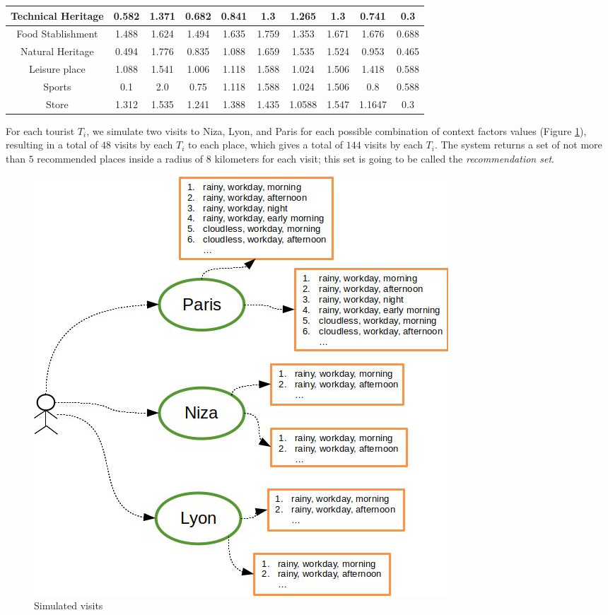 \begin{table}[h!]
\begin{tabular}{ |c|c|c|c|c|c|c|c|c|c| }
    Technical Heritage &
    0.582  & 1.371 & 0.682  & 0.841  & 1.3 & 1.265 & 1.3 & 0.741  & 0.3 \\ \hline
    
    Food Stablishment &
    1.488  & 1.624 & 1.494  & 1.635  & 1.759 & 1.353 & 1.671 & 1.676  & 0.688  \\ \hline
    
    Natural Heritage &
    0.494  & 1.776 & 0.835  & 1.088  & 1.659 & 1.535  & 1.524 & 0.953 & 0.465 \\ \hline
    
    Leisure place &
    1.088  & 1.541  & 1.006 & 1.118 & 1.588  & 1.024 & 1.506 & 1.418 & 0.588  \\ \hline
    
    Sports &
    0.1 & 2.0 & 0.75 & 1.118 & 1.588  & 1.024 & 1.506 & 0.8 & 0.588  \\ \hline
    
    Store &
    1.312 & 1.535  & 1.241  & 1.388  & 1.435  &1.0588  & 1.547  & 1.1647  & 0.3 \\ \hline


\end{tabular}
\end{table}

For each tourist $T_i$, we simulate two visits to Niza, Lyon, and Paris for each possible combination of context factors values (Figure \ref{fig:experiments}), resulting in a total of $48$ visits by each $T_i$ to each place, which gives a total of $144$ visits by each $T_i$. The system returns a set of not more than $5$ recommended places inside a radius of $8$ kilometers for each visit; this set is going to be called the \textit{recommendation set}. 

\begin{figure}[h]
\centering
\includegraphics[scale=0.5]{draws/experiments.jpg}
\caption{Simulated visits}
\label{fig:experiments}
\end{figure}

